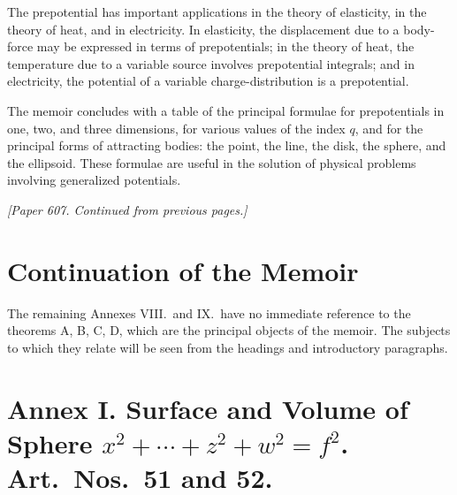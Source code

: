 \documentclass[11pt,a4paper]{book}
\begin{document}
\begin{art}
The prepotential has important applications in the theory of elasticity, in the theory of heat, and in electricity. In elasticity, the displacement due to a body-force may be expressed in terms of prepotentials; in the theory of heat, the temperature due to a variable source involves prepotential integrals; and in electricity, the potential of a variable charge-distribution is a prepotential.
\end{art}

\begin{art}
The memoir concludes with a table of the principal formulae for prepotentials in one, two, and three dimensions, for various values of the index $q$, and for the principal forms of attracting bodies: the point, the line, the disk, the sphere, and the ellipsoid. These formulae are useful in the solution of physical problems involving generalized potentials.
\end{art}
\clearpage


\thispagestyle{fancy}

\noindent\textit{[Paper 607. Continued from previous pages.]}

\section*{Continuation of the Memoir}


\newpage
\begin{art}\label{art:50}
The remaining Annexes VIII.\ and IX.\ have no immediate reference to the theorems A, B, C, D, which are the principal objects of the memoir. The subjects to which they relate will be seen from the headings and introductory paragraphs.
\end{art}

\section*{Annex I. Surface and Volume of Sphere $x^2 + \cdots + z^2 + w^2 = f^2$. Art.\ Nos.\ 51 and 52.}
\end{document}
